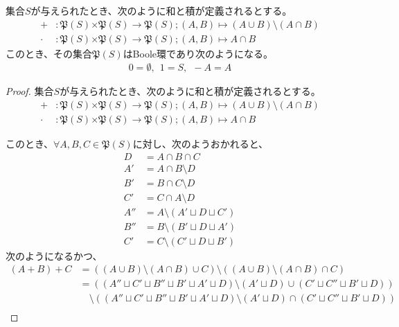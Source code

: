 \documentclass[dvipdfmx]{jsarticle}
\begin{document}
\begin{thm}\label{3.3.1.7}
集合$S$が与えられたとき、次のように和と積が定義されるとする。
\begin{align*}
+&:\mathfrak{P}(S)\mathfrak{\times P}(S)\mathfrak{\rightarrow P}(S);(A,B) \mapsto (A \cup B) \setminus (A \cap B)\\
\cdot &:\mathfrak{P}(S)\mathfrak{\times P}(S)\mathfrak{\rightarrow P}(S);(A,B) \mapsto A \cap B
\end{align*}
このとき、その集合$\mathfrak{P}(S)$はBoole環であり次のようになる。
\begin{align*}
0 = \emptyset,\ \ 1 = S,\ \  - A = A
\end{align*}
\end{thm}
\begin{proof}
集合$S$が与えられたとき、次のように和と積が定義されるとする。
\begin{align*}
+&:\mathfrak{P}(S)\mathfrak{\times P}(S)\mathfrak{\rightarrow P}(S);(A,B) \mapsto (A \cup B) \setminus (A \cap B)\\
\cdot &:\mathfrak{P}(S)\mathfrak{\times P}(S)\mathfrak{\rightarrow P}(S);(A,B) \mapsto A \cap B
\end{align*}\par
このとき、$\forall A,B,C \in \mathfrak{P}(S)$に対し、次のようおかれると、
\begin{align*}
D &= A \cap B \cap C\\
A' &= A \cap B \setminus D\\
B' &= B \cap C \setminus D\\
C' &= C \cap A \setminus D\\
A'' &= A \setminus \left( A' \sqcup D \sqcup C' \right)\\
B'' &= B \setminus \left( B' \sqcup D \sqcup A' \right)\\
C' &= C \setminus \left( C' \sqcup D \sqcup B' \right)
\end{align*}
次のようになるかつ、
\begin{align*}
(A + B) + C &= \left( (A \cup B) \setminus (A \cap B) \cup C \right) \setminus \left( (A \cup B) \setminus (A \cap B) \cap C \right)\\
&= \left( \left( A'' \sqcup C' \sqcup B'' \sqcup B' \sqcup A' \sqcup D \right) \setminus \left( A' \sqcup D \right) \cup \left( C' \sqcup C'' \sqcup B' \sqcup D \right) \right) \\
&\quad \setminus \left( \left( A'' \sqcup C' \sqcup B'' \sqcup B' \sqcup A' \sqcup D \right) \setminus \left( A' \sqcup D \right) \cap \left( C' \sqcup C'' \sqcup B' \sqcup D \right) \right)\\

\end{align*}
\end{proof}
\end{document}

